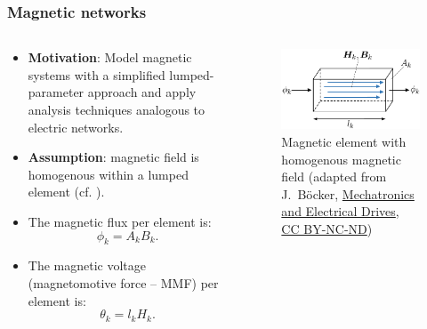 \begin{frame}
	\frametitle{Magnetic networks}
	\begin{columns}
		\begin{column}{0.575\textwidth}
			\begin{itemize}
                \item \textbf{Motivation}: Model magnetic systems with a simplified lumped-parameter approach and apply analysis techniques analogous to electric networks.
                \item<2-> \textbf{Assumption}: magnetic field is homogenous within a lumped element (cf. ).
                \item<3-> The magnetic flux per element is:
                \begin{equation}
                    \phi_k = A_k B_k .
                \end{equation}
                \item<4-> The magnetic voltage (magnetomotive force -- MMF) per element is:
                \begin{equation}
                    \theta_k = l_k H_k .
                \end{equation}
            \end{itemize}
		\end{column}
        \hfill
		\begin{column}{0.425\textwidth}
			\begin{figure}
				\centering
				\includegraphics[height=0.4\textheight]{fig/lec02/Reluctance_element.pdf}
				\caption{Magnetic element with homogenous magnetic field (adapted from J.~B\"ocker, \href{https://digital.ub.uni-paderborn.de/doi/10.17619/UNIPB/1-1640}{Mechatronics and Electrical Drives}, \href{https://creativecommons.org/licenses/by-nc-nd/4.0/deed.en}{CC BY-NC-ND})}
                \label{fig:Reluctance_element}
			\end{figure}
		\end{column}
		\end{columns}
\end{frame}


